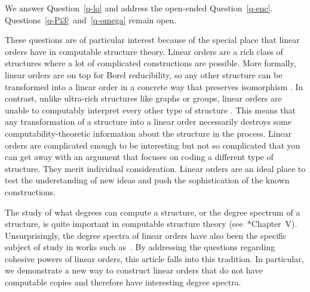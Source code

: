 \documentclass[11pt,a4paper,reqno]{amsart}
\theoremstyle{definition}
\begin{document}
We answer Question~\ref{q-lo} and address the open-ended Question~\ref{q-enc}.  Questions~\ref{q-Pi3}~and~\ref{q-omega} remain open.

These questions are of particular interest because of the special place that linear orders have in computable structure theory.  Linear orders are a rich class of structures where a lot of complicated constructions are possible.  More formally, linear orders are on top for Borel reducibility, so any other structure can be transformed into a linear order in a concrete way that preserves isomorphism \cite{FS89}.  In contrast, unlike ultra-rich structures like graphs or groups, linear orders are unable to computably interpret every other type of structure \cites{Gao01, GHT}.  This means that any transformation of a structure into a linear order necessarily destroys some computability-theoretic information about the structure in the process.  Linear orders are complicated enough to be interesting but not so complicated that you can get away with an argument that focuses on coding a different type of structure.  They merit individual consideration.  Linear orders are an ideal place to test the understanding of new ideas and push the sophistication of the known constructions.

The study of what degrees can compute a structure, or the degree spectrum of a structure, is quite important in computable structure theory (see~\cite{MontalbanBookWithin}*{Chapter~V}).  Unsurprisingly, the degree spectra of linear orders have also been the specific subject of study in works such as~\cites{Ric81, Kni86, JockuschSoareLO, AshJockuschKnight, Mil01}.  By addressing the questions regarding cohesive powers of linear orders, this article falls into this tradition.  In particular, we demonstrate a new way to construct linear orders that do not have computable copies and therefore have interesting degree spectra.
\end{document}
